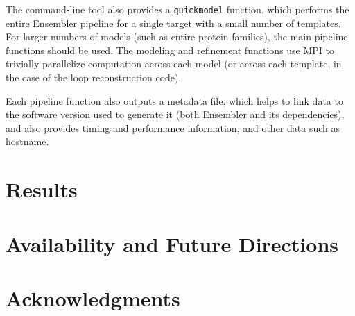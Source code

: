 \documentclass[aps,pre,twocolumn,nofootinbib,superscriptaddress,linenumbers]{revtex4-1}
\begin{document}
The command-line tool also provides a {\tt quickmodel} function, which performs
the entire Ensembler pipeline for a single target with a small number of
templates. For larger numbers of models (such as entire protein families), the
main pipeline functions should be used. The modeling and refinement functions
use MPI to trivially parallelize computation across each model (or across each
template, in the case of the loop reconstruction code).

Each pipeline function also outputs a metadata file, which helps to link data
to the software version used to generate it (both Ensembler and its
dependencies), and also provides timing and performance information, and other
data such as hostname.






\label{section:design}

\section{Results}
\label{section:results}

\section{Availability and Future Directions}
\label{section:availability}

\section{Acknowledgments}
\label{section:acknowledgments}


% 

\end{document}
